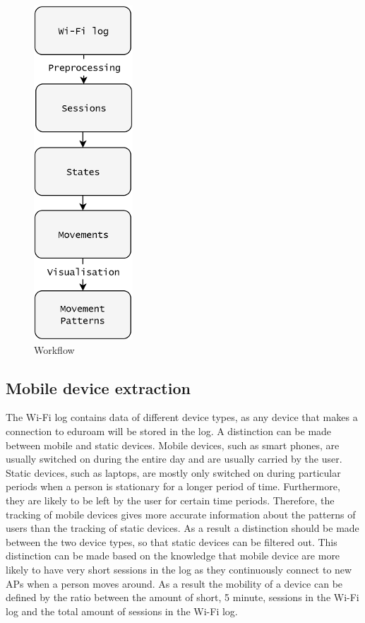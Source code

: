 \begin{figure}[H]
\centering
\includegraphics[scale=0.15]{ES-workflow}
\captionsetup{justification=centering}
\caption{Workflow}
\label{figure:ES-workflow}
\end{figure}

\subsection{Mobile device extraction}\label{ES-mobileDeviceExtraction}
The Wi-Fi log contains data of different device types, as any device that makes a connection to eduroam will be stored in the log. A distinction can be made between mobile and static devices. Mobile devices, such as smart phones, are usually switched on during the entire day and are usually carried by the user. Static devices, such as laptops, are mostly only switched on during particular periods when a person is stationary for a longer period of time. Furthermore, they are likely to be left by the user for certain time periods. Therefore, the tracking of mobile devices gives more accurate information about the patterns of users than the tracking of static devices. As a result a distinction should be made between the two device types, so that static devices can be filtered out. This distinction can be made based on the knowledge that mobile device are more likely to have very short sessions in the log as they continuously connect to new APs when a person moves around. As a result the mobility of a device can be defined by the ratio between the amount of short, 5 minute, sessions in the Wi-Fi log and the total amount of sessions in the Wi-Fi log.

